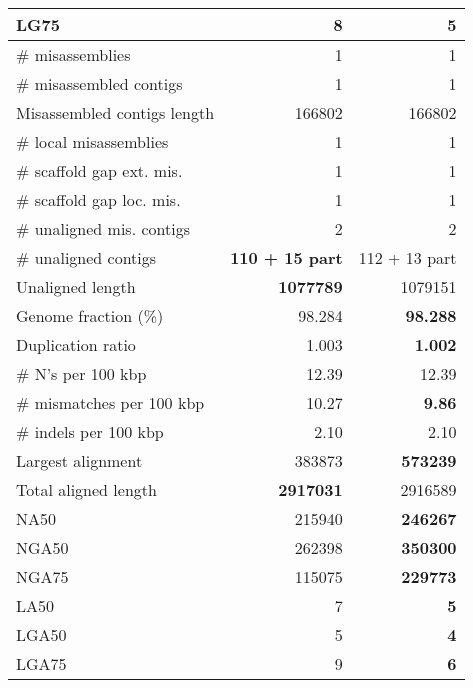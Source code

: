 \documentclass[12pt,a4paper]{article}
\begin{document}
\begin{table}[ht]
\begin{center}
\begin{tabular}{|l*{2}{|r}|}
LG75 & 8 & {\bf 5} \\ \hline
\# misassemblies & 1 & 1 \\ \hline
\# misassembled contigs & 1 & 1 \\ \hline
Misassembled contigs length & 166802 & 166802 \\ \hline
\# local misassemblies & 1 & 1 \\ \hline
\# scaffold gap ext. mis. & 1 & 1 \\ \hline
\# scaffold gap loc. mis. & 1 & 1 \\ \hline
\# unaligned mis. contigs & 2 & 2 \\ \hline
\# unaligned contigs & {\bf 110 + 15 part} & 112 + 13 part \\ \hline
Unaligned length & {\bf 1077789} & 1079151 \\ \hline
Genome fraction (\%) & 98.284 & {\bf 98.288} \\ \hline
Duplication ratio & 1.003 & {\bf 1.002} \\ \hline
\# N's per 100 kbp & 12.39 & 12.39 \\ \hline
\# mismatches per 100 kbp & 10.27 & {\bf 9.86} \\ \hline
\# indels per 100 kbp & 2.10 & 2.10 \\ \hline
Largest alignment & 383873 & {\bf 573239} \\ \hline
Total aligned length & {\bf 2917031} & 2916589 \\ \hline
NA50 & 215940 & {\bf 246267} \\ \hline
NGA50 & 262398 & {\bf 350300} \\ \hline
NGA75 & 115075 & {\bf 229773} \\ \hline
LA50 & 7 & {\bf 5} \\ \hline
LGA50 & 5 & {\bf 4} \\ \hline
LGA75 & 9 & {\bf 6} \\ \hline
\end{tabular}
\end{center}
\end{table}
\end{document}
